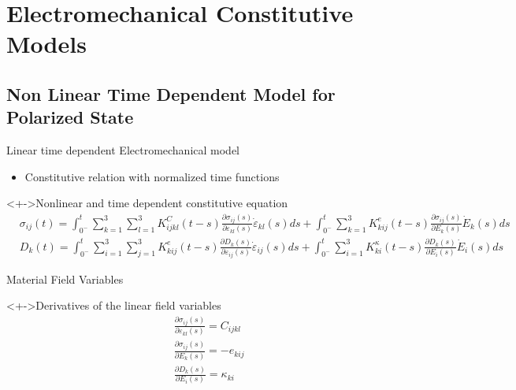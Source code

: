 \documentclass{beamer}
\begin{document}
\section{Electromechanical Constitutive Models}

\subsection{Non Linear Time Dependent Model for Polarized State}

\begin{frame}{Linear time dependent Electromechanical model}
  \begin{itemize}
  \item  Constitutive relation with normalized time functions
\end{itemize} 
\fontsize{8pt}{8pt}

\begin{block}<+->{Nonlinear and time dependent constitutive equation}
\begin{equation}
\begin{aligned}
&\sigma_{ij}(t)=\int_{0^-}^t \sum_{k=1}^{3} \sum_{l=1}^{3} K^C_{ijkl}(t-s) \frac{\partial \sigma_{ij}(s)}{\partial \varepsilon_{kl}(s)}\dot{\varepsilon}_{kl}(s)ds +\int_{0^-}^t \sum_{k=1}^{3} K^e_{kij}(t-s) \frac{\partial \sigma_{ij}(s)}{\partial E_{k}(s)} \dot{E}_{k} (s)ds 
\\
&D_k(t)=\int_{0^-}^t \sum_{i=1}^{3} \sum_{j=1}^{3} K_{kij}^e(t-s) \frac{\partial D_{k}(s)}{\partial \varepsilon_{ij}(s)}\dot{\varepsilon}_{ij}(s)ds +\int_{0^-}^t \sum_{i=1}^{3} K_{ki}^{\kappa}(t-s) \frac{\partial D_{k}(s)}{\partial E_{i}(s)} \dot{E}_{i} (s)ds 
\end{aligned}
\label{EQN:NormalizedConstitutiveRelation}
\end{equation}  
\end{block}
\end{frame}

\begin{frame}{Material Field Variables}

\begin{block}<+->{Derivatives of the linear field variables}
\begin{equation}
\begin{aligned}
&\frac{\partial \sigma_{ij}(s)}{\partial \varepsilon_{kl}(s)}=C_{ijkl} \\
&\frac{\partial \sigma_{ij}(s)}{\partial E_{k}(s)}=-e_{kij} \\
&\frac{\partial D_{k}(s)}{\partial E_{i}(s)}=\kappa_{ki}
\end{aligned}
\label{EQN:Linear_Constants}
\end{equation}  
\end{block}

\end{frame}
\end{document}
